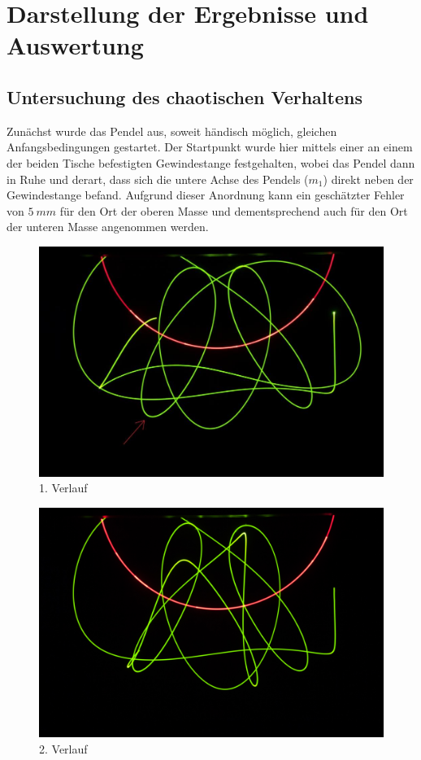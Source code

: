 \section{Darstellung der Ergebnisse und Auswertung}

\subsection{Untersuchung des chaotischen Verhaltens}
Zunächst wurde das Pendel aus, soweit händisch möglich, gleichen Anfangsbedingungen gestartet. Der Startpunkt wurde hier mittels einer an einem der beiden Tische befestigten Gewindestange festgehalten, wobei das Pendel dann in Ruhe und derart, dass sich die untere Achse des Pendels ($ m_{1} $) direkt neben der Gewindestange befand. Aufgrund dieser Anordnung kann ein geschätzter Fehler von $ 5 \ mm $ für den Ort der oberen Masse und dementsprechend auch für den Ort der unteren Masse angenommen werden.


\begin{figure}
        \includegraphics[width=.9\textwidth]{images/pendel-6_.jpg}
\caption{1. Verlauf}
\label{pendel-6}
\end{figure}

\begin{figure}
        \includegraphics[width=.9\textwidth]{images/pendel-10.jpg}
\caption{2. Verlauf}
\label{pendel-10}
\end{figure}

